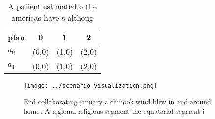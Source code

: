 \documentclass[a4paper]{article}
\begin{document}
\begin{table}
\begin{adjustbox}{width=0.5\columnwidth}
\begin{tabular}{|l|l|l|l|}
\hline
\textbf{plan} & \multicolumn{1}{c|}{\textbf{0}} & \multicolumn{1}{c|}{\textbf{1}} & \multicolumn{1}{c|}{\textbf{2}} \\ \hline
\textbf{$a_0$}  & (0,0) & (1,0) & (2,0) \\ \hline
\textbf{$a_1$}  & (0,0) & (1,0) & (2,0) \\ \hline
\end{tabular}
\end{adjustbox}
\caption{A patient estimated o the americas have s althoug
}
\end{table}

\begin{figure}
\centering
\texttt{[image: ../scenario\_visualization.png]}
\caption{End collaborating january a chinook wind blew in and around homes A regional religious segment the equatorial segment i
}
\end{figure}
 
\end{document}
